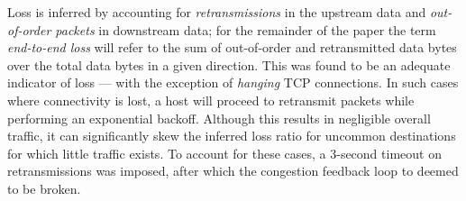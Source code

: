 
Loss is inferred by accounting for \emph{retransmissions} in the upstream data and \emph{out-of-order packets} in downstream data; for the remainder of the paper the term \emph{end-to-end loss} will refer to the sum of out-of-order and retransmitted data bytes over the total data bytes in a given direction.
This was found to be an adequate indicator of loss --- with the exception of \emph{hanging} \ac{TCP} connections. 
In such cases where connectivity is lost, a host will proceed to retransmit packets while performing an exponential backoff. 
Although this results in negligible overall traffic, it can significantly skew the inferred loss ratio for uncommon destinations for which little traffic exists. 
To account for these cases, a 3-second timeout on retransmissions was imposed, after which the congestion feedback loop to deemed to be broken. 

